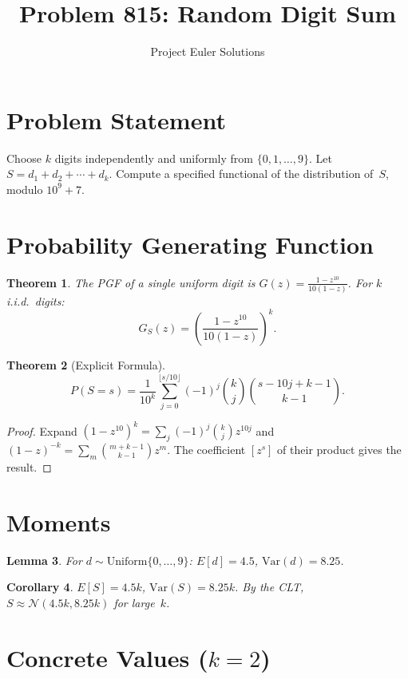\documentclass[11pt]{article}
\title{Problem 815: Random Digit Sum}
\author{Project Euler Solutions}
\date{}
\newtheorem{theorem}{Theorem}
\newtheorem{lemma}[theorem]{Lemma}
\newtheorem{corollary}[theorem]{Corollary}
\begin{document}
\maketitle

\section{Problem Statement}

Choose $k$ digits independently and uniformly from $\{0, 1, \ldots, 9\}$. Let $S = d_1 + d_2 + \cdots + d_k$. Compute a specified functional of the distribution of~$S$, modulo $10^9+7$.

\section{Probability Generating Function}

\begin{theorem}
The PGF of a single uniform digit is $G(z) = \frac{1-z^{10}}{10(1-z)}$. For $k$ i.i.d.\ digits:
\[
G_S(z) = \left(\frac{1-z^{10}}{10(1-z)}\right)^{\!k}.
\]
\end{theorem}

\begin{theorem}[Explicit Formula]
\[
P(S = s) = \frac{1}{10^k} \sum_{j=0}^{\lfloor s/10 \rfloor} (-1)^j \binom{k}{j} \binom{s - 10j + k - 1}{k - 1}.
\]
\end{theorem}

\begin{proof}
Expand $(1-z^{10})^k = \sum_j (-1)^j \binom{k}{j} z^{10j}$ and $(1-z)^{-k} = \sum_m \binom{m+k-1}{k-1} z^m$. The coefficient $[z^s]$ of their product gives the result.
\end{proof}

\section{Moments}

\begin{lemma}
For $d \sim \mathrm{Uniform}\{0,\ldots,9\}$: $E[d] = 4.5$, $\mathrm{Var}(d) = 8.25$.
\end{lemma}

\begin{corollary}
$E[S] = 4.5k$, $\mathrm{Var}(S) = 8.25k$. By the CLT, $S \approx \mathcal{N}(4.5k, 8.25k)$ for large~$k$.
\end{corollary}

\section{Concrete Values ($k=2$)}
\end{document}
